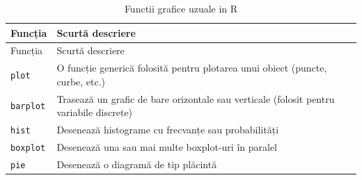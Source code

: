 \documentclass[]{article}
\begin{document}
\begin{longtable}[]{@{}ll@{}}
\caption{Functii grafice uzuale in R}\tabularnewline
\toprule
\begin{minipage}[b]{0.37\columnwidth}\raggedright\strut
Funcția\strut
\end{minipage} & \begin{minipage}[b]{0.34\columnwidth}\raggedright\strut
Scurtă descriere\strut
\end{minipage}\tabularnewline
\midrule
\endfirsthead
\toprule
\begin{minipage}[b]{0.37\columnwidth}\raggedright\strut
Funcția\strut
\end{minipage} & \begin{minipage}[b]{0.34\columnwidth}\raggedright\strut
Scurtă descriere\strut
\end{minipage}\tabularnewline
\midrule
\endhead
\begin{minipage}[t]{0.37\columnwidth}\raggedright\strut
\texttt{plot}\strut
\end{minipage} & \begin{minipage}[t]{0.34\columnwidth}\raggedright\strut
O funcție generică folosită pentru plotarea unui obiect (puncte, curbe,
etc.)\strut
\end{minipage}\tabularnewline
\begin{minipage}[t]{0.37\columnwidth}\raggedright\strut
\texttt{barplot}\strut
\end{minipage} & \begin{minipage}[t]{0.34\columnwidth}\raggedright\strut
Trasează un grafic de bare orizontale sau verticale (folosit pentru
variabile discrete)\strut
\end{minipage}\tabularnewline
\begin{minipage}[t]{0.37\columnwidth}\raggedright\strut
\texttt{hist}\strut
\end{minipage} & \begin{minipage}[t]{0.34\columnwidth}\raggedright\strut
Desenează histograme cu frecvanțe sau probabilități\strut
\end{minipage}\tabularnewline
\begin{minipage}[t]{0.37\columnwidth}\raggedright\strut
\texttt{boxplot}\strut
\end{minipage} & \begin{minipage}[t]{0.34\columnwidth}\raggedright\strut
Desenează una sau mai multe boxplot-uri în paralel\strut
\end{minipage}\tabularnewline
\begin{minipage}[t]{0.37\columnwidth}\raggedright\strut
\texttt{pie}\strut
\end{minipage} & \begin{minipage}[t]{0.34\columnwidth}\raggedright\strut
Desenează o diagramă de tip plăcintă\strut
\end{minipage}\tabularnewline
\bottomrule
\end{longtable}
\end{document}
